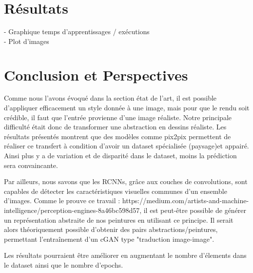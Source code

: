 \documentclass[a4paper, 12pt]{report}
\begin{document}
\chapter{Résultats}
- Graphique temps d'apprentissages / exécutions\\
- Plot d'images


\chapter{Conclusion et Perspectives\label{chap-conclusion}}

Comme nous l'avons évoqué dans la section état de l'art, il est possible d'appliquer efficacement un style donnée à une image, mais pour que le rendu soit crédible, il faut que l'entrée provienne d'une image réaliste. Notre principale difficulté était donc de transformer une abstraction en dessins réaliste. Les résultats présentés montrent que des modèles comme pix2pix permettent de réaliser ce transfert à condition d'avoir un dataset spécialisée (paysage)et appairé. Ainsi plus y a de variation et de disparité dans le dataset, moins la prédiction sera convaincante.

Par ailleurs, nous savons que les RCNNs, grâce aux couches de convolutions, sont capables de détecter les caractéristiques visuelles communes d'un ensemble d'images. Comme le prouve ce travail : https://medium.com/artists-and-machine-intelligence/perception-engines-8a46bc598d57, il est peut-être possible de générer un représentation abstraite de nos peintures en utilisant ce principe. Il serait alors théoriquement possible d'obtenir des pairs abstractions/peintures, permettant l'entraînement d'un cGAN type "traduction image-image". 

Les résultats pourraient être améliorer en augmentant le nombre d'élements dans le dataset ainsi que le nombre d'epochs.




\end{document}
